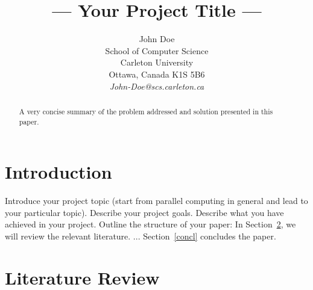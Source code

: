 \documentclass[11pt]{article}       %
\begin{document}


\title{--- Your Project Title ---}


\author{
John Doe\\
School of Computer Science\\
Carleton University\\
Ottawa, Canada K1S 5B6\\
{\em John-Doe@scs.carleton.ca}
} %

\maketitle

\begin{abstract}
A very concise summary of the problem addressed and solution presented in this paper.
\end{abstract}


\section{Introduction} \label{intro}

Introduce your project topic (start from parallel computing in
general and lead to your particular topic). Describe your project
goals. Describe what you have achieved in your project. Outline
the structure of your paper: In Section~\ref{litrev}, we will
review the relevant literature.  ...
Section~\ref{concl} concludes the paper.


\section{Literature Review} \label{litrev}
\end{document}
